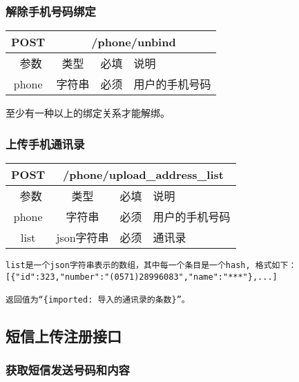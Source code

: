 \subsubsection{解除手机号码绑定}
\label{hash_algorithm}

\begin{table}[H]
   \begin{center}
\begin{tabular}{|c|c|c|p{12cm}|}
\hline
POST & \multicolumn{3}{|c|}{/phone/unbind} \\
\hline\hline
 \  参数  & 类型 & 必填 &  说明  \\
\hline
 phone  & 字符串 & 必须 &  用户的手机号码\\
\hline
\end{tabular}
   \end{center}
\end{table}
至少有一种以上的绑定关系才能解绑。


\subsubsection{上传手机通讯录}
\label{hash_algorithm}

\begin{table}[H]
   \begin{center}
\begin{tabular}{|c|c|c|p{12cm}|}
\hline
POST & \multicolumn{3}{|c|}{/phone/upload\_address\_list} \\
\hline\hline
 \  参数  & 类型 & 必填 &  说明  \\
\hline
 phone  & 字符串 & 必须 &  用户的手机号码\\
 \hline
 list  & json字符串 & 必须 &  通讯录\\
\hline
\end{tabular}
   \end{center}
\end{table}


\begin{verbatim}
list是一个json字符串表示的数组，其中每一个条目是一个hash, 格式如下：
[{"id":323,"number":"(0571)28996083","name":"***"},...]

返回值为“{imported: 导入的通讯录的条数}”。
\end{verbatim}


\subsection{短信上传注册接口}


\subsubsection{获取短信发送号码和内容}

